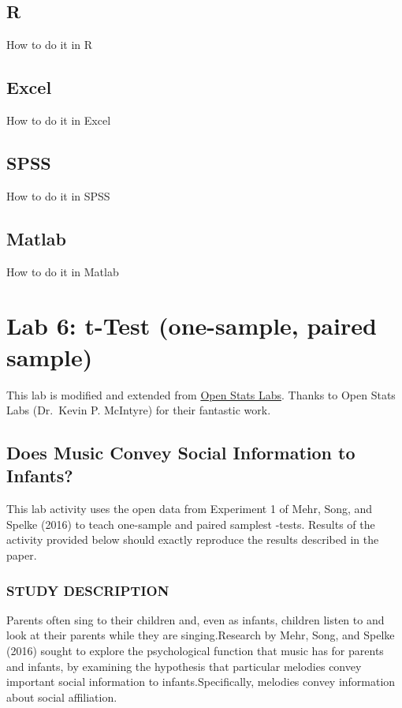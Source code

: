 \documentclass[]{book}
\theoremstyle{definition}
\theoremstyle{definition}
\theoremstyle{definition}
\theoremstyle{remark}
\begin{document}
\section{R}\label{r-5}

How to do it in R

\section{Excel}\label{excel-4}

How to do it in Excel

\section{SPSS}\label{spss-4}

How to do it in SPSS

\section{Matlab}\label{matlab-4}

How to do it in Matlab

\chapter{Lab 6: t-Test (one-sample, paired
sample)}\label{lab-6-t-test-one-sample-paired-sample}

This lab is modified and extended from
\href{https://sites.trinity.edu/osl}{Open Stats Labs}. Thanks to Open
Stats Labs (Dr.~Kevin P. McIntyre) for their fantastic work.

\section{Does Music Convey Social Information to
Infants?}\label{does-music-convey-social-information-to-infants}

This lab activity uses the open data from Experiment 1 of Mehr, Song,
and Spelke (2016) to teach one-sample and paired samplest -tests.
Results of the activity provided below should exactly reproduce the
results described in the paper.

\subsection{STUDY DESCRIPTION}\label{study-description}

Parents often sing to their children and, even as infants, children
listen to and look at their parents while they are singing.Research by
Mehr, Song, and Spelke (2016) sought to explore the psychological
function that music has for parents and infants, by examining the
hypothesis that particular melodies convey important social information
to infants.Specifically, melodies convey information about social
affiliation.
\end{document}
